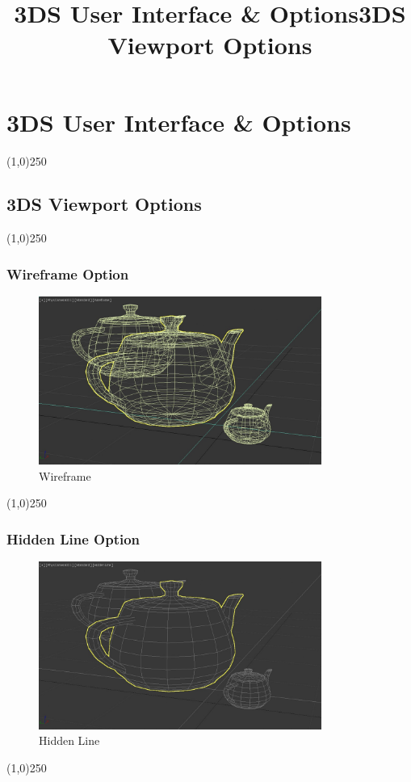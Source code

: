 \section{3DS User Interface \& Options}
\begin{frame}
\title[3DS User Interface \& Options]{3DS User Interface \& Options}
\titlepage
\end{frame}\begin{center}\line(1,0){250}\end{center}




\subsection{3DS Viewport Options}
\begin{frame}
\title[3DS Viewport Options]{3DS Viewport Options}
\titlepage
\end{frame}\begin{center}\line(1,0){250}\end{center}


\begin{frame}
\frametitle{Wireframe Option}
\begin{figure}
	\centering
	\includegraphics[height=5.5cm]{img/ViewportOptions/Wireframe.jpg}
	\caption{Wireframe}
	\label{fig:WireframeOption}
\end{figure}
\end{frame}
\begin{center}\line(1,0){250}\end{center}




\begin{frame}
\frametitle{Hidden Line Option}
\begin{figure}
	\centering
	\includegraphics[height=5.5cm]{img/ViewportOptions/HiddenLine.jpg}
	\caption{Hidden Line}
	\label{fig:HiddenLine}
\end{figure}
\end{frame}
\begin{center}\line(1,0){250}\end{center}


